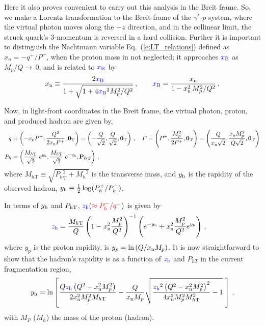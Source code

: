 \documentclass[final,3p,times,onecolumn,sort&compress,hidelinks]{elsarticle}
\newcommand{\xbj}{\ensuremath{{\cbl x_{\rm B}}}}
\newcommand{\xn}{\ensuremath{x_{\rm n}}}
\newcommand{\zh}{\ensuremath{{\cbl z_{\rm h}}}}
\newcommand{\Tsc}[2]{#1_{#2\text{T}}}
\newcommand{\Tscsq}[2]{#1^2_{#2\text{T}}}
\newcommand{\hady}{\ensuremath{y_{\rm h}}}
\newcommand{\PhT}{\ensuremath{P_{hT}}}
\newcommand{\hadp}{{\ensuremath{{\bf P}_h}}}
\newcommand{\hadpsc}{{\ensuremath{P_h}}}
\newcommand{\hadmass}{\ensuremath{M_h}}
\newcommand{\T}[2]{\boldsymbol{#1}_{#2\text{T}}}
\newcommand{\parz}[1]{\ensuremath{\left(#1\right)}}
\newcommand\3[1]{\boldsymbol{#1}}
\newcommand{\crd}{\color{red}}
\newcommand{\cbl}{\color{blue}}
\newcommand{\bea}{\begin{eqnarray}}
\newcommand{\eea}{\end{eqnarray}}
\begin{document}
 Here it also proves convenient to carry out this analysis in the Breit frame.
 So, we make a Lorentz transformation to  the Breit-frame of the  $\gamma^*$-$p$
 system, where the virtual photon moves along the $-z$ direction, and in the collinear limit, the struck quark's $3$-momentum is reversed in a hard collision.
  Further it is important to distinguish the Nachtmann variable Eq.~(\ref{e:LT_relations}) defined as $x_n=-q^+/P^+$, when the proton mass in not neglected; it approaches $\xbj$ as $M_p/Q\rightarrow\, 0$, and is related to $\xbj$ by
\begin{equation}
 \xn \equiv \frac{2 \xbj}{1 + \sqrt{1 + 4 \xbj^2 M_p^2/Q^2} }\,,
 \qquad 
 \xbj = \frac{\xn}{1 - \xn^2\,M_p^2/Q^2 }\, .
\label{eq:xn.xbj}
\end{equation}


Now, in light-front coordinates in the Breit frame, the virtual photon, proton, and produced hadron are given by,
\begin{align}
  q &{}= \parz{-\xn P^+,\frac{Q^2}{2 \xn P^+}, \T{0}{} } = \parz{-\frac{Q}{\sqrt{2}},\frac{Q}{\sqrt{2}},\T{0}{} }\, , \quad  P {}= \parz{P^+,\frac{M_p^2}{2 P^+},\T{0}{} } = \parz{\frac{Q}{\xn \sqrt{2}},\frac{\xn M_p^2}{Q \sqrt{2} },\T{0}{} }\\ \hadpsc &{}= \parz{\frac{\Tsc{M}{h}}{\sqrt{2}} \; e^{\hady},\frac{\Tsc{M}{h}}{\sqrt{2}} \; e^{-\hady},\T{\hadp}{} }\, ,
  \label{eq:hadmom} 
\end{align}
where  $\Tsc{M}{h} \equiv \sqrt{ \Tscsq{\hadpsc}{} + \hadmass^2 }$ is the transverse mass, and  $\hady$ is the
rapidity of the observed hadron, $\hady\equiv \frac{1}{2}\log(P_h^+/P_h^-)$.

In terms of $\hady$ and $\Tsc{P}{\rm h}$, $\zh({\crd \approx P_h^-/q^-})$ is given by
\begin{align}
\zh  &=  
   \frac{\Tsc{M}{h}}{Q} \parz{1-\xn^2 \frac{M_p^2}{Q^2}}^{-1} \parz{ e^{-\hady}  +
   \xn^2 \frac{M_p^2}{Q^2}  e^{\hady} }
   \, , 
\label{eq:z}
\end{align}%
where $y_p$ is the proton rapidity, is $y_p =  \ln \parz{Q/\xn M_p}$. It is 
now straightforward to show that the hadron's rapidity is as a function of $\zh$ and $\PhT$ in the current fragmentation region,
\bea
\hady =   \ln \left[\frac{Q \zh \left(Q^2-\xn^2 M_p^2\right)}{2 \xn^2 M_p^2
   \Tsc{M}{h} } - \frac{Q}{\xn M_p} \sqrt{\frac{\zh^2 \left(Q^2-\xn^2 M_p^2\right)^2}{4 \xn^2 M_p^2
   \Tsc{M}{h} ^2}- 1} \; \right] \, , 
\label{eq:rapvalue}
\eea
with $M_P$ ($M_h$) the mass of the proton (hadron).
\end{document}
